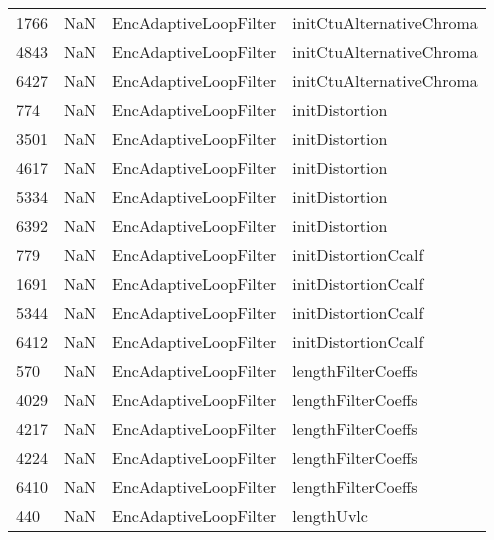 \begin{tabular}{llll}
1766 &                   NaN &      EncAdaptiveLoopFilter &                  initCtuAlternativeChroma \\
4843 &                   NaN &      EncAdaptiveLoopFilter &                  initCtuAlternativeChroma \\
6427 &                   NaN &      EncAdaptiveLoopFilter &                  initCtuAlternativeChroma \\
774  &                   NaN &      EncAdaptiveLoopFilter &                            initDistortion \\
3501 &                   NaN &      EncAdaptiveLoopFilter &                            initDistortion \\
4617 &                   NaN &      EncAdaptiveLoopFilter &                            initDistortion \\
5334 &                   NaN &      EncAdaptiveLoopFilter &                            initDistortion \\
6392 &                   NaN &      EncAdaptiveLoopFilter &                            initDistortion \\
779  &                   NaN &      EncAdaptiveLoopFilter &                       initDistortionCcalf \\
1691 &                   NaN &      EncAdaptiveLoopFilter &                       initDistortionCcalf \\
5344 &                   NaN &      EncAdaptiveLoopFilter &                       initDistortionCcalf \\
6412 &                   NaN &      EncAdaptiveLoopFilter &                       initDistortionCcalf \\
570  &                   NaN &      EncAdaptiveLoopFilter &                        lengthFilterCoeffs \\
4029 &                   NaN &      EncAdaptiveLoopFilter &                        lengthFilterCoeffs \\
4217 &                   NaN &      EncAdaptiveLoopFilter &                        lengthFilterCoeffs \\
4224 &                   NaN &      EncAdaptiveLoopFilter &                        lengthFilterCoeffs \\
6410 &                   NaN &      EncAdaptiveLoopFilter &                        lengthFilterCoeffs \\
440  &                   NaN &      EncAdaptiveLoopFilter &                                lengthUvlc \\

\end{tabular}
